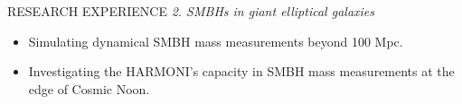 \documentclass{resume} %
\begin{document}
\begin{rSection}{RESEARCH EXPERIENCE}
\textit{2. SMBHs in giant elliptical galaxies} %
\vspace{-2mm}
\begin{itemize}
    \itemsep -3pt {} 
    \item Simulating dynamical SMBH mass measurements beyond 100 Mpc.
     \item Investigating the HARMONI's capacity in SMBH mass measurements at the edge of Cosmic Noon.
 \end{itemize}

 
\end{rSection} 
\end{document}
